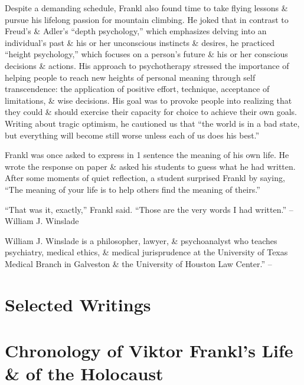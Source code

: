 \documentclass{article}
\numberwithin{equation}{section}
\begin{document}
Despite a demanding schedule, Frankl also found time to take flying lessons \& pursue his lifelong passion for mountain climbing. He joked that in contrast to Freud's  \& Adler's ``depth psychology,'' which emphasizes delving into an individual's past \& his or her unconscious instincts \& desires, he practiced ``height psychology,'' which focuses on a person's future \& his or her conscious decisions \& actions. His approach to psychotherapy stressed the importance of helping people to reach new heights of personal meaning through self transcendence: the application of positive effort, technique, acceptance of limitations, \& wise decisions. His goal was to provoke people into realizing that they could \& should exercise their capacity for choice to achieve their own goals. Writing about tragic optimism, he cautioned us that ``the world is in a bad state, but everything will become still worse unless each of us does his best.''

Frankl was once asked to express in 1 sentence the meaning of his own life. He wrote the response on paper \& asked his students to guess what he had written. After some moments of quiet reflection, a student surprised Frankl by saying, ``The meaning of your life is to help others find the meaning of theirs.'' 

``That was it, exactly,'' Frankl said. ``Those are the very words I had written.'' -- William J. Winslade

William J. Winslade is a philosopher, lawyer, \& psychoanalyst who teaches psychiatry, medical ethics, \& medical jurisprudence at the University of Texas Medical Branch in Galveston \& the University of Houston Law Center.'' -- \cite[pp. 108--116]{Frankl2017}


\section{Selected Writings}


\section{Chronology of Viktor Frankl's Life \& of the Holocaust}


\printbibliography[heading=bibintoc]
	
\end{document}
